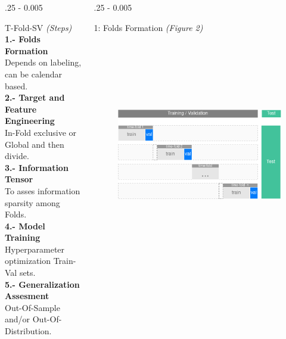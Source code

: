 \documentclass{postertheme}\usepackage[]{graphicx}\usepackage[]{color}
\begin{document}
\begin{frame}
\begin{columns}[onlytextwidth]
\begin{column}{.25 \textwidth - 0.005 \textwidth}
\begin{block}{T-Fold-SV \footnotesize \textit{(Steps)}}
      \textbf{1.- Folds Formation} \\
        Depends on labeling, can be calendar based.\\
      \textbf{2.- Target and Feature Engineering} \\
        In-Fold exclusive or Global and then divide.\\
      \textbf{3.- Information Tensor} \\
        To asses information sparsity among Folds.\\
      \textbf{4.- Model Training} \\
        Hyperparameter optimization Train-Val sets.\\
      \textbf{5.- Generalization Assesment} \\
        Out-Of-Sample and/or Out-Of-Distribution.
        
    \end{block}
  \end{column}

  \begin{column}{.25 \textwidth - 0.005 \textwidth}
    \begin{block}{1: Folds Formation \textit{(Figure 2)}} 
        
      \begin{figure}
        \includegraphics[width=18cm, height=10cm, keepaspectratio=true]{figures/T-Fold-SV.png}
      \end{figure}
        
    \end{block}
  \end{column}
  

\end{columns}
\end{frame}
\end{document}
